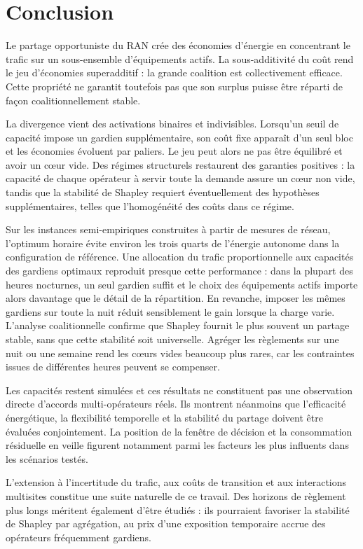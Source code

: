 \section{Conclusion}

Le partage opportuniste du RAN crée des économies d'énergie en concentrant le
trafic sur un sous-ensemble d'équipements actifs. La sous-additivité du coût
rend le jeu d'économies superadditif : la grande coalition est collectivement
efficace. Cette propriété ne garantit toutefois pas que son surplus puisse
être réparti de façon coalitionnellement stable.

La divergence vient des activations binaires et indivisibles. Lorsqu'un seuil
de capacité impose un gardien supplémentaire, son coût fixe apparaît d'un seul
bloc et les économies évoluent par paliers. Le jeu peut alors ne pas être
équilibré et avoir un cœur vide. Des régimes structurels restaurent des
garanties positives : la capacité de chaque opérateur à servir toute la
demande assure un cœur non vide, tandis que la stabilité de Shapley requiert
éventuellement des hypothèses supplémentaires, telles que l'homogénéité des
coûts dans ce régime.

Sur les instances semi-empiriques construites à partir de mesures de réseau,
l'optimum horaire évite environ les trois quarts de l'énergie autonome dans
la configuration de référence. Une allocation du trafic proportionnelle aux
capacités des gardiens optimaux reproduit presque cette performance : dans la
plupart des heures nocturnes, un seul gardien suffit et le choix des
équipements actifs importe alors davantage que le détail de la répartition.
En revanche, imposer les mêmes gardiens sur toute la nuit réduit sensiblement
le gain lorsque la charge varie. L'analyse coalitionnelle confirme que
Shapley fournit le plus souvent un partage stable, sans que cette stabilité
soit universelle. Agréger les règlements sur une nuit ou une semaine rend les
cœurs vides beaucoup plus rares, car les contraintes issues de différentes
heures peuvent se compenser.

Les capacités restent simulées et ces résultats ne constituent pas une
observation directe d'accords multi-opérateurs réels. Ils montrent néanmoins
que l'efficacité énergétique,
la flexibilité temporelle et la stabilité du partage doivent être évaluées
conjointement. La position de la fenêtre de décision et la consommation
résiduelle en veille figurent notamment parmi les facteurs les plus influents
dans les scénarios testés.

L'extension à l'incertitude du trafic, aux coûts de transition et aux
interactions multisites constitue une suite naturelle de ce travail. Des
horizons de règlement plus longs méritent également d'être étudiés : ils
pourraient favoriser la stabilité de Shapley par agrégation, au prix d'une
exposition temporaire accrue des opérateurs fréquemment gardiens.
